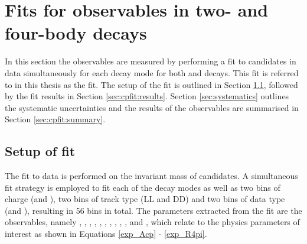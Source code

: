 \clearpage
%

\chapter{\label{ch:5-cpfit}Fits for \CP observables in two- and four-body decays} 

\minitoc

In this section the \CP observables are measured by performing a fit to \btodkst candidates in data simultaneously for each \Dz decay mode for both \Bp and \Bm decays. This fit is referred to in this thesis as the \CP fit. The setup of the \CP fit is outlined in Section \ref{sec:cpfit:setup}, followed by the fit results in Section \ref{sec:cpfit:results}. Section \ref{sec:systematics} outlines the systematic uncertainties and the results of the \CP observables are summarised in Section \ref{sec:cpfit:summary}.

\section{Setup of \CP fit}
\label{sec:cpfit:setup}

The fit to data is performed on the invariant mass of \btodkst candidates. A simultaneous fit strategy is employed to fit each of the \Dz decay modes as well as two bins of \B charge (\Bp and \Bm), two bins of \KS track type (LL and DD) and two bins of data type (\runone and \runtwo), resulting in 56 bins in total. The parameters extracted from the \CP fit are the \CP observables, namely \Akpi, \Akk, \Apipi, \Rkk, \Rpipi, \Rptwo, \Rmtwo, \Akpipipi, \Apipipipi, \Rpipipipi, \Rpfour and \Rmfour, which relate to the physics parameters of interest as shown in Equations \ref{exp_Acp} - \ref{exp_R4pi}.


